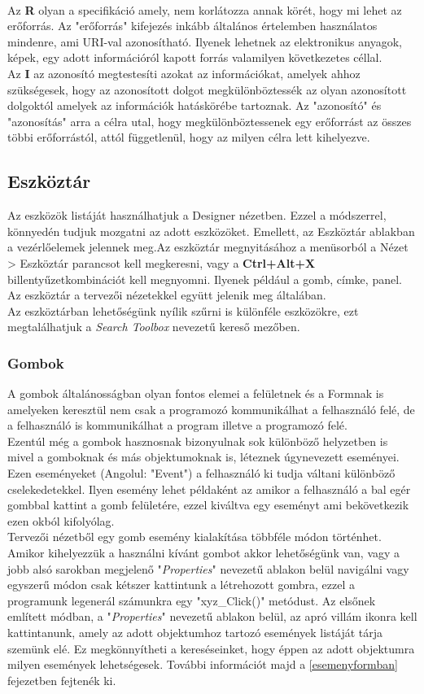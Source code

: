 \documentclass[tocnopagenum]{thesis-ekf}
\theoremstyle{definition}
\theoremstyle{remark}
\begin{document}
\\
Az \textbf{R} olyan a specifikáció amely, nem korlátozza annak körét, hogy mi lehet az erőforrás. Az "erőforrás" kifejezés inkább általános értelemben használatos mindenre, ami URI-val azonosítható. Ilyenek lehetnek az elektronikus anyagok, képek, egy adott információról kapott forrás valamilyen következetes céllal.
\\
Az \textbf{I} az azonosító megtestesíti azokat az információkat, amelyek ahhoz szükségesek, hogy az azonosított dolgot megkülönböztessék az olyan azonosított dolgoktól amelyek az információk hatáskörébe tartoznak.
Az "azonosító" és "azonosítás" arra a célra utal, hogy megkülönböztessenek egy erőforrást az összes többi erőforrástól, attól függetlenül, hogy az milyen célra lett kihelyezve.  
	\subsection{Eszköztár}
	\label{EszkozLista}
	Az eszközök listáját használhatjuk a Designer nézetben. Ezzel a módszerrel, könnyedén tudjuk mozgatni az adott eszközöket. Emellett, az Eszköztár ablakban a vezérlőelemek jelennek meg.Az eszköztár megnyitásához a menüsorból a Nézet > Eszköztár parancsot kell megkeresni, vagy a \textbf{Ctrl+Alt+X} billentyűzetkombinációt kell megnyomni. Ilyenek például a gomb, címke, panel. Az eszköztár a tervezői nézetekkel együtt jelenik meg általában. 
	\\
	Az eszköztárban lehetőségünk nyílik szűrni is különféle eszközökre, ezt megtalálhatjuk a \textit{Search Toolbox} nevezetű kereső mezőben.
	\subsubsection{Gombok}
	\label{Gombok}
	A gombok általánosságban olyan fontos elemei a felületnek és a Formnak is amelyeken keresztül nem csak a programozó kommunikálhat a felhasználó felé, de a felhasználó is kommunikálhat a program illetve a programozó felé. 
	\\
	Ezentúl még a gombok hasznosnak bizonyulnak sok különböző helyzetben is mivel a gomboknak és más objektumoknak is, léteznek úgynevezett eseményei. Ezen eseményeket (Angolul: "Event") a felhasználó ki tudja váltani különböző cselekedetekkel. Ilyen esemény lehet példaként az amikor a felhasználó a bal egér gombbal kattint a gomb felületére, ezzel kiváltva egy eseményt ami bekövetkezik ezen okból kifolyólag.
	\\
	Tervezői nézetből egy gomb esemény kialakítása többféle módon történhet. Amikor kihelyezzük a használni kívánt gombot akkor lehetőségünk van, vagy a jobb alsó sarokban megjelenő "\textit{Properties}" nevezetű ablakon belül navigálni vagy egyszerű módon csak kétszer kattintunk a létrehozott gombra, ezzel a programunk legenerál számunkra egy "xyz\_Click()" metódust.
	Az elsőnek említett módban, a "\textit{Properties}" nevezetű ablakon belül, az apró villám ikonra kell kattintanunk, amely az adott objektumhoz tartozó események listáját tárja szemünk elé. Ez megkönnyítheti a kereséseinket, hogy éppen az adott objektumra milyen események lehetségesek. További információt majd a \ref{esemenyformban} fejezetben fejtenék ki.
\end{document}
